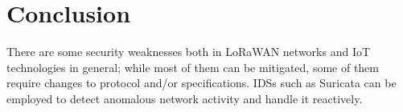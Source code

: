 \documentclass{article}
\begin{document}
\section{Conclusion}
There are some security weaknesses both in LoRaWAN networks and IoT technologies in general; while most of them can be mitigated, some of them require changes to protocol and/or specifications. IDSs such as Suricata can be employed to detect anomalous network activity and handle it reactively.

\pagebreak



\end{document}
